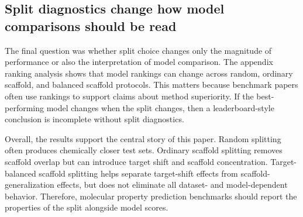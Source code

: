 \subsection{Split diagnostics change how model comparisons should be read}

The final question was whether split choice changes only the magnitude of performance or also the interpretation of model comparison. The appendix ranking analysis shows that model rankings can change across random, ordinary scaffold, and balanced scaffold protocols. This matters because benchmark papers often use rankings to support claims about method superiority. If the best-performing model changes when the split changes, then a leaderboard-style conclusion is incomplete without split diagnostics.

Overall, the results support the central story of this paper. Random splitting often produces chemically closer test sets. Ordinary scaffold splitting removes scaffold overlap but can introduce target shift and scaffold concentration. Target-balanced scaffold splitting helps separate target-shift effects from scaffold-generalization effects, but does not eliminate all dataset- and model-dependent behavior. Therefore, molecular property prediction benchmarks should report the properties of the split alongside model scores.
